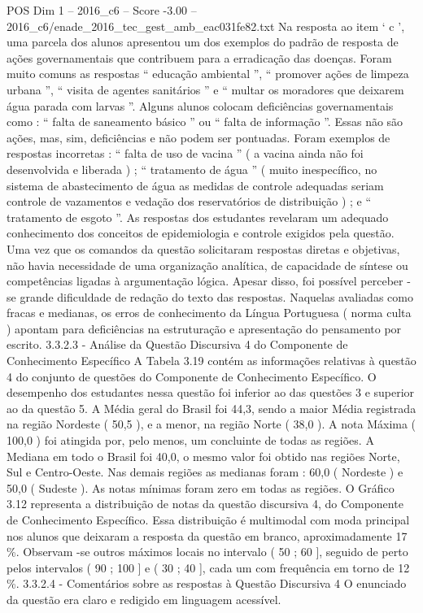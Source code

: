\begin{textsample}{POS Dim 1 – 2016\_c6 – Score -3.00 – 2016\_c6/enade\_2016\_tec\_gest\_amb\_eac031fe82.txt}
Na resposta ao item ‘ c ’, uma parcela dos alunos apresentou um dos exemplos do padrão de resposta de ações governamentais que contribuem para a erradicação das doenças.
Foram muito comuns as respostas “ educação ambiental ”, “ promover ações de limpeza urbana ”, “ visita de agentes sanitários ” e “ multar os moradores que deixarem água parada com larvas ”.
Alguns alunos colocam deficiências governamentais como : “ falta de saneamento básico ” ou “ falta de informação ”.
Essas não são ações, mas, sim, deficiências e não podem ser pontuadas.
Foram exemplos de respostas incorretas : “ falta de uso de vacina ” ( a vacina ainda não foi desenvolvida e liberada ) ; “ tratamento de água ” ( muito inespecífico, no sistema de abastecimento de água as medidas de controle adequadas seriam controle de vazamentos e vedação dos reservatórios de distribuição ) ; e “ tratamento de esgoto ”.
As respostas dos estudantes revelaram um adequado conhecimento dos conceitos de epidemiologia e controle exigidos pela questão.
Uma vez que os comandos da questão solicitaram respostas diretas e objetivas, não havia necessidade de uma organização analítica, de capacidade de síntese ou competências ligadas à argumentação lógica.
Apesar disso, foi possível perceber -se grande dificuldade de redação do texto das respostas.
Naquelas avaliadas como fracas e medianas, os erros de conhecimento da Língua Portuguesa ( norma culta ) apontam para deficiências na estruturação e apresentação do pensamento por escrito. 3.3.2.3 - Análise da Questão Discursiva 4 do Componente de Conhecimento Específico A Tabela 3.19 contém as informações relativas à questão 4 do conjunto de questões do Componente de Conhecimento Específico.
O desempenho dos estudantes nessa questão foi inferior ao das questões 3 e superior ao da questão 5.
A Média geral do Brasil foi 44,3, sendo a maior Média registrada na região Nordeste ( 50,5 ), e a menor, na região Norte ( 38,0 ).
A nota Máxima ( 100,0 ) foi atingida por, pelo menos, um concluinte de todas as regiões.
A Mediana em todo o Brasil foi 40,0, o mesmo valor foi obtido nas regiões Norte, Sul e Centro-Oeste.
Nas demais regiões as medianas foram : 60,0 ( Nordeste ) e 50,0 ( Sudeste ).
As notas mínimas foram zero em todas as regiões.
O Gráfico 3.12 representa a distribuição de notas da questão discursiva 4, do Componente de Conhecimento Específico.
Essa distribuição é multimodal com moda principal nos alunos que deixaram a resposta da questão em branco, aproximadamente 17 \%.
Observam -se outros máximos locais no intervalo ( 50 ; 60 ], seguido de perto pelos intervalos ( 90 ; 100 ] e ( 30 ; 40 ], cada um com frequência em torno de 12 \%. 3.3.2.4 - Comentários sobre as respostas à Questão Discursiva 4 O enunciado da questão era claro e redigido em linguagem acessível.

\end{textsample}
